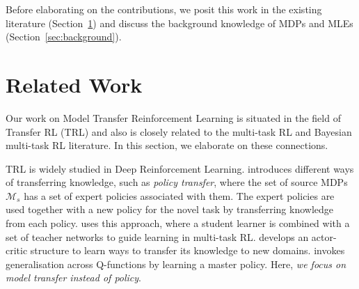Before elaborating on the contributions, we posit this work in the existing literature (Section~\ref{sec:related}) and discuss the background knowledge of MDPs and MLEs (Section~\ref{sec:background}).

\section{Related Work}\label{sec:related}
Our work on Model Transfer Reinforcement Learning is situated in the field of Transfer RL (TRL) and also is closely related to the multi-task RL and Bayesian multi-task RL literature. In this section, we elaborate on these connections.

TRL is widely studied in Deep Reinforcement Learning. \citep{zhu2023transfer} introduces different ways of transferring knowledge, such as \emph{policy transfer}, where the set of source MDPs $\mathcal{M}_s$ has a set of expert policies associated with them. The expert policies are used together with a new policy for the novel task by transferring knowledge from each policy. \citep{rusu2015policy} uses this approach, where a student learner is combined with a set of teacher networks to guide learning in multi-task RL. \citep{parisotto2015actor} develops an actor-critic structure to learn ways to transfer its knowledge to new domains.   \citep{arnekvist2019vpe} invokes generalisation across Q-functions by learning a master policy. Here,\textit{ we focus on model transfer instead of policy}.

